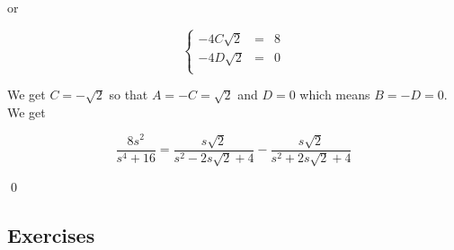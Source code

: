 \begin{ex}
\begin{enumerate}
or 

\[ \left\{ \begin{array}{rcr}  -4C\sqrt{2}& = & 8 \\ -4D\sqrt{2} & = & 0 \\ \end{array} \right.\] 

We get $C = -\sqrt{2}$ so that $A = -C = \sqrt{2}$ and $D = 0$ which means $B = -D = 0$.  We get

\[ \dfrac{8s^2}{s^4+16} = \dfrac{s\sqrt{2}}{s^2 - 2s\sqrt{2} + 4} - \dfrac{s\sqrt{2}}{s^2 + 2s\sqrt{2} + 4}\]

\qed

\end{enumerate}

\end{ex}

\newpage

\subsection{Exercises}



\closegraphsfile